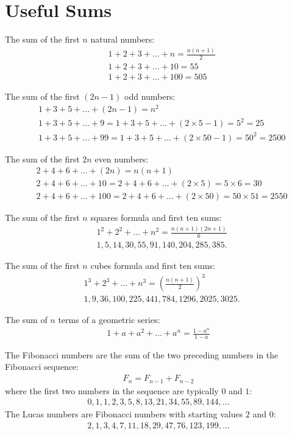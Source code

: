 
\section*{Useful Sums}
The sum of the first $n$ natural numbers:
\begin{align*}
& 1+2+3+\ldots+n = \frac{n(n+1)}{2} \\
& 1+2+3+\ldots+10 = 55 \\
& 1+2+3+\ldots+100 = 505
\end{align*}

The sum of the first $(2n-1)$ odd numbers:
\begin{align*}
& 1+3+5+\ldots+(2n-1) = n^2 \\
& 1+3+5+\ldots+9 = 1+3+5+\ldots+(2\times5-1) = 5^2 = 25 \\
& 1+3+5+\ldots+99 = 1+3+5+\ldots+(2\times50-1) = 50^2 =  2500
\end{align*}

The sum of the first $2n$ even numbers:
\begin{align*}
& 2+4+6+\ldots+(2n) = n(n+1) \\
& 2+4+6+\ldots+10 = 2+4+6+\ldots+(2\times5) = 5 \times 6 = 30 \\
& 2+4+6+\ldots+100 = 2+4+6+\ldots+(2\times50) = 50\times51 = 2550
\end{align*}

The sum of the first $n$ squares formula and first ten sums:
\begin{align*}
& 1^2+2^2+\ldots+n^2 = \frac{n(n+1)(2n+1)}{6} \\
& 1, 5, 14, 30, 55, 91, 140, 204, 285, 385.
\end{align*}

The sum of the first $n$ cubes formula and first ten sums:
\begin{align*}
& 1^3+2^3+\ldots+n^3 = \left(\frac{n(n+1)}{2}\right)^{3} \\
& 1, 9, 36, 100, 225, 441, 784, 1296, 2025, 3025.
\end{align*}


The sum of $n$ terms of a geometric series:
\begin{align*}
1 + a + a^2 + \ldots + a^n
 = \frac{1-a^n}{1-a}
\end{align*}


The Fibonacci numbers are the sum of the two preceding numbers in the Fibonacci sequence:
\begin{align*}
F_{n} = F_{n-1} + F_{n-2}
\end{align*}
where the first two numbers in the sequence are typically $0$ and $1$:
\begin{align*}
0, 1 , 1, 2, 3, 5, 8, 13, 21, 34, 55, 89, 144, \ldots
\end{align*}
The Lucas numbers are Fibonacci numbers with starting values $2$ and $0$:
\begin{align*}
2, 1, 3, 4, 7, 11, 18, 29, 47, 76, 123, 199, \ldots
\end{align*}